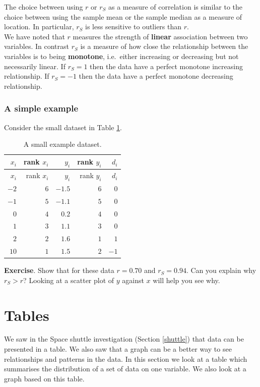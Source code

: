 \documentclass[
  11pt,
  british,
  openany, a4paper]{book}
\begin{document}
The choice between using \(r\) or \(r_S\) as a measure of correlation is similar to the choice between using the sample mean or the sample median as a measure of location. In particular, \(r_S\) is less sensitive to outliers than \(r\).\\
We have noted that \(r\) measures the strength of \textbf{linear} association between two variables. In contrast \(r_S\) is a measure of how close the relationship between the variables is to being \textbf{monotone}, i.e.~either increasing or decreasing but not necessarily linear. If \(r_S=1\) then the data have a perfect monotone increasing relationship. If \(r_S=-1\) then the data have a perfect monotone decreasing relationship.

\hypertarget{a-simple-example}{%
\subsubsection*{A simple example}\label{a-simple-example}}

Consider the small dataset in Table \ref{tab:smalldata}.

\begin{longtable}[]{@{}rrrrr@{}}
\caption{\label{tab:smalldata} A small example dataset.}\tabularnewline
\toprule
\(x_i\) & rank \(x_i\) & \(y_i\) & rank \(y_i\) & \(d_i\)\tabularnewline
\midrule
\endfirsthead
\toprule
\(x_i\) & rank \(x_i\) & \(y_i\) & rank \(y_i\) & \(d_i\)\tabularnewline
\midrule
\endhead
\(-2\) & \(6\) & \(-1.5\) & \(6\) & \(0\)\tabularnewline
\(-1\) & \(5\) & \(-1.1\) & \(5\) & \(0\)\tabularnewline
\(0\) & \(4\) & \(0.2\) & \(4\) & \(0\)\tabularnewline
\(1\) & \(3\) & \(1.1\) & \(3\) & \(0\)\tabularnewline
\(2\) & \(2\) & \(1.6\) & \(1\) & \(1\)\tabularnewline
\(10\) & \(1\) & \(1.5\) & \(2\) & \(-1\)\tabularnewline
\bottomrule
\end{longtable}

\textbf{Exercise}. Show that for these data \(r=0.70\) and \(r_S=0.94\). Can you explain why \(r_S>r\)? Looking at a scatter plot of \(y\) against \(x\) will help you see why.

\hypertarget{tables}{%
\section{Tables}\label{tables}}

We saw in the Space shuttle investigation (Section \ref{shuttle}) that data can be presented in a table. We also saw that a graph can be a better way to see relationships and patterns in the data. In this section we look at a table which summarises the distribution of a set of data on one variable. We also look at a graph based on this table.
\end{document}
